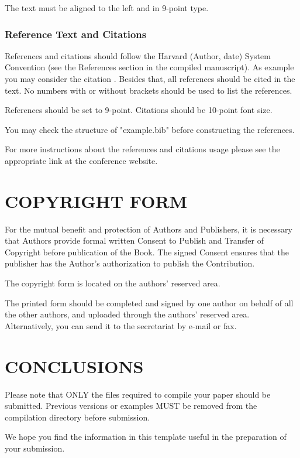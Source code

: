 \documentclass[a4paper,twoside]{article}
\begin{document}
The text must be aligned to the left and in 9-point type.

\vfill
\subsubsection{Reference Text and Citations}

References and citations should follow the Harvard (Author, date)
System Convention (see the References section in the compiled
manuscript). As example you may consider the citation
\cite{Smith98}. Besides that, all references should be cited in the
text. No numbers with or without brackets should be used to list the
references.

References should be set to 9-point. Citations should be 10-point
font size.

You may check the structure of "example.bib" before constructing the
references.

For more instructions about the references and citations usage
please see the appropriate link at the conference website.

\section{\uppercase{Copyright Form}}

\noindent For the mutual benefit and protection of Authors and
Publishers, it is necessary that Authors provide formal written
Consent to Publish and Transfer of Copyright before publication of
the Book. The signed Consent ensures that the publisher has the
Author's authorization to publish the Contribution.

The copyright form is located on the authors' reserved area.

The printed form should be completed and signed by one author on
behalf of all the other authors, and uploaded through the authors' reserved area. Alternatively, you can send it to the secretariat by e-mail or fax.

\section{\uppercase{Conclusions}}
\label{sec:conclusion}

\noindent Please note that ONLY the files required to compile your paper should be submitted. Previous versions or examples MUST be removed from the compilation directory before submission.

We hope you find the information in this template useful in the preparation of your submission.
\end{document}
